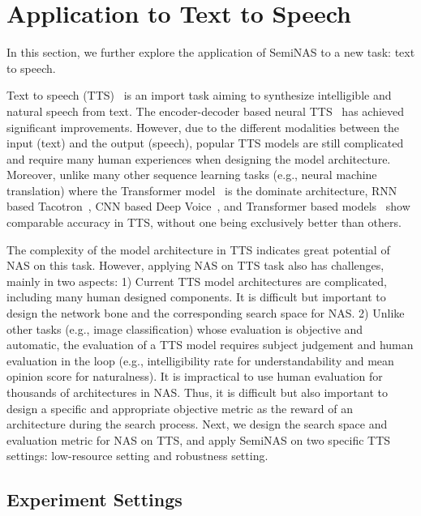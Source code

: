 \documentclass{article}
\begin{document}
\section{Application to Text to Speech}
\label{sec:tts}
In this section, we further explore the application of SemiNAS to a new task: text to speech. 

Text to speech (TTS)~\cite{tacotron,tacotron2,deepvoice3,transformertts,fastspeech} is an import task aiming to synthesize intelligible and natural speech from text. The encoder-decoder based neural TTS~\cite{tacotron2} has achieved significant improvements. However, due to the different modalities between the input (text) and the output (speech), popular TTS models are still complicated and require many human experiences when designing the model architecture. Moreover, unlike many other sequence learning tasks (e.g., neural machine translation) where the Transformer model~\cite{transformer} is the dominate architecture, RNN based Tacotron~\cite{tacotron,tacotron2}, CNN based Deep Voice~\cite{deepvoice,deepvoice2,deepvoice3}, and Transformer based models~\cite{transformertts} show comparable accuracy in TTS, without one being exclusively better than others.

The complexity of the model architecture in TTS indicates great potential of NAS on this task. However, applying NAS on TTS task also has challenges, mainly in two aspects: 1) Current TTS model architectures are complicated, including many human designed components. It is difficult but important to design the network bone and the corresponding search space for NAS. 2) Unlike other tasks (e.g., image classification) whose evaluation is objective and automatic, the evaluation of a TTS model requires subject judgement and human evaluation in the loop (e.g., intelligibility rate for understandability and mean opinion score for naturalness). It is impractical to use human evaluation for thousands of architectures in NAS. Thus, it is difficult but also important to design a specific and appropriate objective metric as the reward of an architecture during the search process. Next, we design the search space and evaluation metric for NAS on TTS, and apply SemiNAS on two specific TTS settings: low-resource setting and robustness setting. 

\subsection{Experiment Settings}
\end{document}
